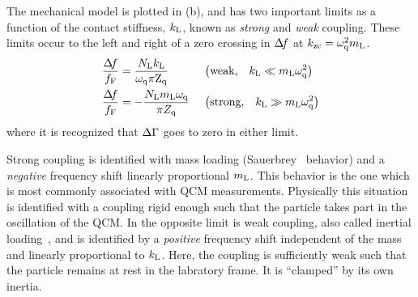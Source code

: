 The mechanical model is plotted in (b), and 
has two important limits as a function of the contact
stiffness, $k_\mathrm{L}$, known as \textit{strong} and \textit{weak} coupling.
These limits occur to the left and right of a zero crossing in $\Delta\!f$ at
$k_\mathrm{zc}=\omega_\mathrm{q}^2 m_\mathrm{L}$.
\begin{align}
\frac{\Delta\!f}{f_\mathrm{F}}&= 
\frac{N_\mathrm{L} k_\mathrm{L}}
{\omega_\mathrm{q}\pi \mathrm{Z}_\mathrm{q}}
&\,&\left(\text{weak,}\quad k_\mathrm{L}\ll m_\mathrm{L}
\omega_\mathrm{q}^2\right)
\label{eqn:couplinguy1}
\\
\frac{\Delta\!f}{f_\mathrm{F}}&=  -\frac{N_\mathrm{L}
m_\mathrm{L} \omega_\mathrm{q}}{\pi Z_\mathrm{q}}
&\,&\left(\text{strong,}\quad k_\mathrm{L}\gg m_\mathrm{L}
\omega_\mathrm{q}^2\right)
\label{eqn:couplinguy2}
\end{align}
where it is recognized that $\Delta\Gamma$ goes to zero in either limit.

Strong coupling is identified with mass loading
(Sauerbrey~\cite{sauerbrey1959verwendung} behavior) and a \textit{negative}
frequency shift linearly proportional $m_\mathrm{L}$.  This behavior is the one
which is most commonly associated with QCM measurements.  Physically this
situation is identified with a coupling rigid enough such that the particle
takes part in the oscillation of the QCM.  In the opposite limit is weak
coupling, also called inertial loading~\cite{dybwad1985sensitive}, and is
identified by a \textit{positive} frequency shift independent of the mass
and linearly proportional to $k_\mathrm{L}$.  Here, the coupling is sufficiently
weak such that the particle remains at rest in the labratory frame.  It is
``clamped'' by its own inertia.~\cite{du2008role}


